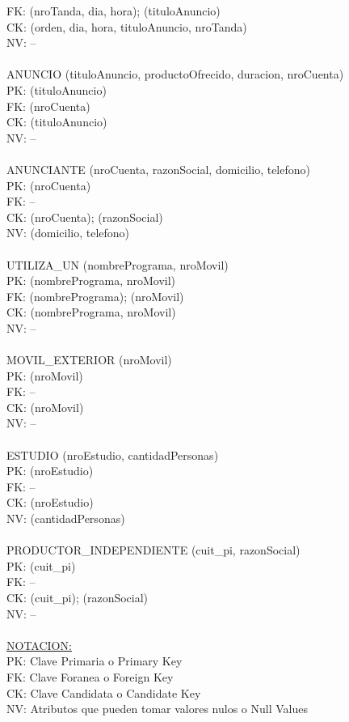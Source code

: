 \documentclass[a4paper,10pt,titlepage]{article}
\begin{document}
FK: (nroTanda, dia, hora); (tituloAnuncio)\\
CK: (orden, dia, hora, tituloAnuncio, nroTanda)\\
NV: --\\
\\
ANUNCIO (tituloAnuncio, productoOfrecido, duracion, nroCuenta)\\
PK: (tituloAnuncio)\\
FK: (nroCuenta)\\
CK: (tituloAnuncio)\\
NV: --\\
\\
ANUNCIANTE (nroCuenta, razonSocial, domicilio, telefono)\\
PK: (nroCuenta)\\
FK: --\\
CK: (nroCuenta); (razonSocial)\\
NV: (domicilio, telefono)\\
\\
UTILIZA\_UN (nombrePrograma, nroMovil)\\
PK: (nombrePrograma, nroMovil)\\
FK: (nombrePrograma); (nroMovil)\\
CK: (nombrePrograma, nroMovil)\\
NV: --\\
\\
MOVIL\_EXTERIOR (nroMovil)\\
PK: (nroMovil)\\
FK: --\\
CK: (nroMovil)\\
NV: --\\
\\
ESTUDIO (nroEstudio, cantidadPersonas)\\
PK: (nroEstudio)\\
FK: --\\
CK: (nroEstudio)\\
NV: (cantidadPersonas)\\
\\
PRODUCTOR\_INDEPENDIENTE (cuit\_pi, razonSocial)\\
PK: (cuit\_pi)\\
FK: --\\
CK: (cuit\_pi); (razonSocial)\\
NV: --\\
\\
\underline{NOTACION:}\\
PK: Clave Primaria o Primary Key\\
FK: Clave Foranea o Foreign Key\\
CK: Clave Candidata o Candidate Key\\
NV: Atributos que pueden tomar valores nulos o Null Values\\
\\
\end{document}

